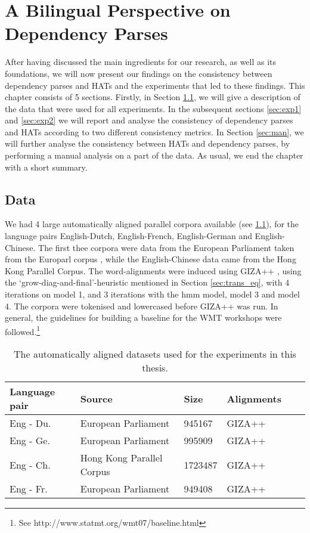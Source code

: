 %
%

\chapter{A Bilingual Perspective on Dependency Parses}
\label{chap:exp}

After having discussed the main ingredients for our research, as well as its foundations, we will now present our findings on the consistency between dependency parses and HATs and the experiments that led to these findings. This chapter consists of 5 sections. Firstly, in Section \ref{sec:data}, we will give a description of the data that were used for all experiments. In the subsequent sections \ref{sec:exp1} and \ref{sec:exp2} we will report and analyse the consistency of dependency parses and HATs according to two different consistency metrics. In Section \ref{sec:man}, we will further analyse the consistency between HATs and dependency parses, by performing a manual analysis on a part of the data. As usual, we end the chapter with a short summary.

\section{Data}
\label{sec:data}

We had 4 large automatically aligned parallel corpora available (see \ref{tab:datasets1}), for the language pairs English-Dutch, English-French, English-German and English-Chinese. The first thee corpora were data from the European Parliament taken from the Europarl corpus \citep{koehn2005europarl}, while the English-Chinese data came from the Hong Kong Parallel Corpus. The word-alignments were induced using GIZA++ \citep{och03:asc}, using the `grow-diag-and-final'-heuristic mentioned in Section \ref{sec:trans_eq}, with 4 iterations on model 1, and 3 iterations with the hmm model, model 3 and model 4. The corpora were tokenised and lowercased before GIZA++ was run. In general, the guidelines for building a baseline for the WMT workshops were followed.\footnote{See http://www.statmt.org/wmt07/baseline.html}

\begin{table}
\centering
\begin{tabular}{|l|l|l|l|l|l|}
\hline
\bf Language pair & \bf Source & \bf Size & \bf Alignments\\
\hline \hline
Eng - Du. & European Parliament & 945167 & {\small GIZA++} \\
\hline
Eng - Ge. & European Parliament & 995909 & {\small GIZA++} \\
\hline
Eng - Ch. & Hong Kong Parallel Corpus & 1723487 & {\small GIZA++} \\
\hline
Eng - Fr. & European Parliament & 949408 & {\small GIZA++} \\
\hline
\end{tabular}
\caption{The automatically aligned datasets used for the experiments in this thesis.}\label{tab:datasets1}
\end{table}

